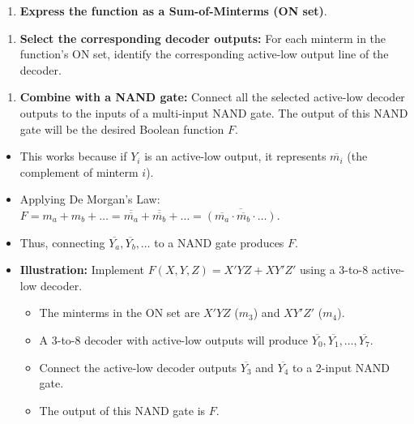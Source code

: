 \documentclass{article}
\begin{document}
\begin{enumerate}
\item \textbf{Express the function as a Sum-of-Minterms (ON set)}.

\end{enumerate}
\begin{enumerate}
\item \textbf{Select the corresponding decoder outputs:} For each minterm in the function's ON set, identify the corresponding active-low output line of the decoder.

\end{enumerate}
\begin{enumerate}
\item \textbf{Combine with a NAND gate:} Connect all the selected active-low decoder outputs to the inputs of a multi-input NAND gate. The output of this NAND gate will be the desired Boolean function $F$.

\end{enumerate}
    \begin{itemize}
        \item This works because if $Y_i$ is an active-low output, it represents $\overline{m_i}$ (the complement of minterm $i$).
        \item Applying De Morgan's Law: $F = m_a + m_b + \dots = \overline{\overline{m_a}} + \overline{\overline{m_b}} + \dots = \overline{(\overline{m_a} \cdot \overline{m_b} \cdot \dots)}$.
        \item Thus, connecting $\overline{Y_a}, \overline{Y_b}, \dots$ to a NAND gate produces $F$.
    \end{itemize}

\begin{itemize}
    \item \textbf{Illustration:} Implement $F(X,Y,Z) = X'YZ + XY'Z'$ using a 3-to-8 active-low decoder.

        \begin{itemize}
            \item The minterms in the ON set are $X'YZ$ ($m_3$) and $XY'Z'$ ($m_4$).
            \item A 3-to-8 decoder with active-low outputs will produce $\overline{Y_0}, \overline{Y_1}, \dots, \overline{Y_7}$.
            \item Connect the active-low decoder outputs $\overline{Y_3}$ and $\overline{Y_4}$ to a 2-input NAND gate.
            \item The output of this NAND gate is $F$.
        \end{itemize}
\end{itemize}
\end{document}
